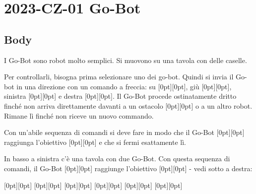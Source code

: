 \documentclass[a4paper,11pt]{report}
\newcommand{\taskGraphicsFolder}{..}
\begin{document}
\section*{\centering{} 2023-CZ-01 Go-Bot}


\subsection*{Body}

I Go-Bot sono robot molto semplici. Si muovono su una tavola con delle caselle.

{\centering%
\par}

Per controllarli, bisogna prima selezionare uno dei go-bot.
Quindi si invia il Go-bot in una direzione con un comando a freccia:
su \raisebox{-0.5ex}[0pt][0pt]{}, giù \raisebox{-0.5ex}[0pt][0pt]{}, sinistra \raisebox{-0.5ex}[0pt][0pt]{} e destra \raisebox{-0.5ex}[0pt][0pt]{}.
Il Go-Bot procede ostinatamente dritto finché non arriva direttamente davanti a un ostacolo \raisebox{-0.5ex}[0pt][0pt]{} o a un altro robot.
Rimane lì finché non riceve un nuovo commando.

Con un’abile sequenza di comandi si deve fare in modo che il Go-Bot \raisebox{-0.5ex}[0pt][0pt]{} raggiunga l’obiettivo \raisebox{-0.5ex}[0pt][0pt]{} e che si fermi esattamente lì.

In basso a sinistra c’è una tavola con due Go-Bot.
Con questa sequenza di comandi, il Go-Bot \raisebox{-0.5ex}[0pt][0pt]{} raggiunge l’obiettivo \raisebox{-0.5ex}[0pt][0pt]{} - vedi sotto a destra:

{\centering%
\raisebox{-0.5ex}[0pt][0pt]{} \raisebox{-0.5ex}[0pt][0pt]{} \raisebox{-0.5ex}[0pt][0pt]{} \raisebox{-0.5ex}[0pt][0pt]{} \raisebox{-0.5ex}[0pt][0pt]{} \raisebox{-0.5ex}[0pt][0pt]{}

{\centering%
\par}\par}
\end{document}
